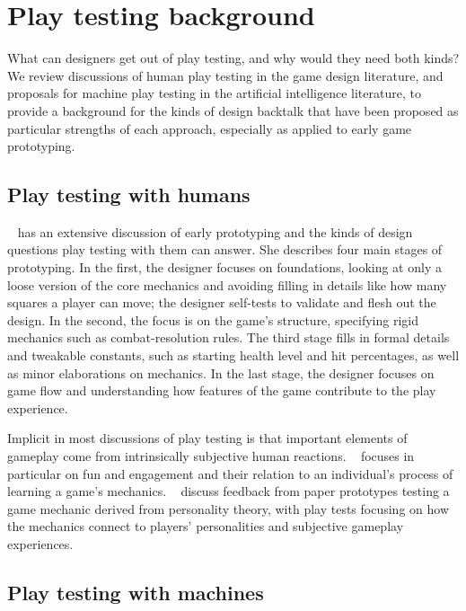 \documentclass[letterpaper]{article}
\newcommand{\citenoun}[1]{\citeauthor{#1}~\shortcite{#1}}
\newcommand{\citenounpg}[2]{\citeauthor{#2}~\shortcite[#1]{#2}}
\begin{document}
\section{Play testing background}

What can designers get out of play testing, and why would they need both kinds?
We review discussions of human play testing in the game design literature, and
proposals for machine play testing in the artificial intelligence literature,
to provide a background for the kinds of design backtalk that have been
proposed as particular strengths of each approach, especially as applied to
early game prototyping.

\subsection{Play testing with humans}

\citenounpg{ch.\ 7}{Fullerton} has an extensive discussion of early
prototyping and the kinds of design questions play testing with them can
answer. She describes four main stages of prototyping. In the first, the
designer focuses on foundations, looking at only a loose version of the core
mechanics and avoiding filling in details like how many squares a player can
move; the designer self-tests to validate and flesh out the design. In the
second, the focus is on the game's structure, specifying rigid mechanics
such as combat-resolution rules.  The third
stage fills in formal details and tweakable constants, such as starting health level and hit
percentages, as well as minor elaborations on mechanics. In the last stage,
the designer focuses on game flow and understanding how 
features of the game contribute to the play experience.

Implicit in most discussions of play testing is that important elements of
gameplay come from intrinsically subjective human reactions.
\citenoun{theoryoffun} focuses in particular on fun and engagement and their
relation to an individual's process of learning a game's mechanics.
\citenoun{Mirjam:MMO} discuss feedback from paper prototypes testing a game
mechanic derived from personality theory, with play tests focusing on how the
mechanics connect to players' personalities and subjective gameplay
experiences.

\subsection{Play testing with machines}
\end{document}
